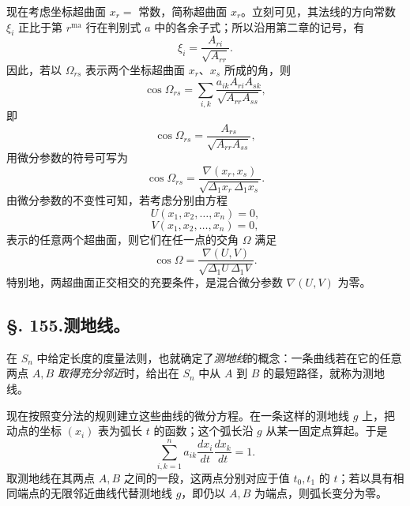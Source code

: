 现在考虑坐标超曲面 \(x_r=\) 常数，简称超曲面 \(x_r\)。立刻可见，其法线的方向常数 \(\xi_i\) 正比于第 \(r^{\text{ma}}\) 行在判别式 \(a\) 中的各余子式；所以沿用第二章的记号，有
\[
 \xi_i=\frac{A_{ri}}{\sqrt{A_{rr}}}.
\]
因此，若以 \(\Omega_{rs}\) 表示两个坐标超曲面 \(x_r\)、\(x_s\) 所成的角，则
\[
 \cos\Omega_{rs}=\sum_{i,k}\frac{a_{ik}A_{ri}A_{sk}}{\sqrt{A_{rr}A_{ss}}},
\]
即
\[
 \cos\Omega_{rs}=\frac{A_{rs}}{\sqrt{A_{rr}A_{ss}}},
\]
用微分参数的符号可写为
\[
 \cos\Omega_{rs}=\frac{\nabla(x_r,x_s)}{\sqrt{\Delta_1x_r\,\Delta_1x_s}}.
\]
由微分参数的不变性可知，若考虑分别由方程
\[
 U(x_1,x_2,\ldots,x_n)=0,
\]
\[
 V(x_1,x_2,\ldots,x_n)=0,
\]
表示的任意两个超曲面，则它们在任一点的交角 \(\Omega\) 满足
\begin{equation}\tag{5}
 \cos\Omega=\frac{\nabla(U,V)}{\sqrt{\Delta_1U\,\Delta_1V}}.
\end{equation}
特别地，两超曲面正交相交的充要条件，是混合微分参数 \(\nabla(U,V)\) 为零。

\subsection*{\S. 155.\quad 测地线。}

在 \(S_n\) 中给定长度的度量法则，也就确定了\emph{测地线}的概念：一条曲线若在它的任意两点 \(A,B\) \emph{取得充分邻近}时，给出在 \(S_n\) 中从 \(A\) 到 \(B\) 的最短路径，就称为测地线。

现在按照变分法的规则建立这些曲线的微分方程。在一条这样的测地线 \(g\) 上，把动点的坐标 \((x_i)\) 表为弧长 \(t\) 的函数；这个弧长沿 \(g\) 从某一固定点算起。于是
\begin{equation}\tag{5*}
 \sum_{i,k=1}^{n}a_{ik}\frac{dx_i}{dt}\frac{dx_k}{dt}=1.
\end{equation}
取测地线在其两点 \(A,B\) 之间的一段，这两点分别对应于值 \(t_0,t_1\) 的 \(t\)；若以具有相同端点的无限邻近曲线代替测地线 \(g\)，即仍以 \(A,B\) 为端点，则弧长变分为零。

